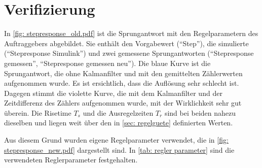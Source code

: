 \documentclass[./\jobname.tex]{subfiles}
\begin{document}
\section{Verifizierung}
%
In \autoref{fig: stepresponse_old.pdf} ist die Sprungantwort mit den Regelparametern des Auftraggebers abgebildet. Sie enthält den Vorgabewert (\enquote{Step}), die simulierte (\enquote{Stepresponse Simulink}) und zwei gemessene Sprungantworten (\enquote{Stepresponse gemessen}, \enquote{Stepresponse gemessen neu}). Die blaue Kurve ist die Sprungantwort, die ohne Kalmanfilter und mit den gemittelten Zählerwerten aufgenommen wurde. Es ist ersichtlich, dass die Auflösung sehr schlecht ist. Dagegen stimmt die violette Kurve, die mit dem Kalmanfilter und der Zeitdifferenz des Zählers aufgenommen wurde, mit der Wirklichkeit sehr gut überein. Die Risetime \(T_{s}\) und die Ausregelzeiten \(T_{r}\) sind bei beiden nahezu dieselben und liegen weit über den in \autoref{sec: regelguete} definierten Werten.
%
\begin{figure}[H]
	\centering
	\noindent{}
	\label{fig: stepresponse_old.pdf}
\end{figure}
%
Aus diesem Grund wurden eigene Regelparameter verwendet, die in \autoref{fig: stepresponse_new.pdf} dargestellt sind. In \autoref{tab: regler parameter} sind die verwendeten Reglerparameter festgehalten.\par
\end{document}
